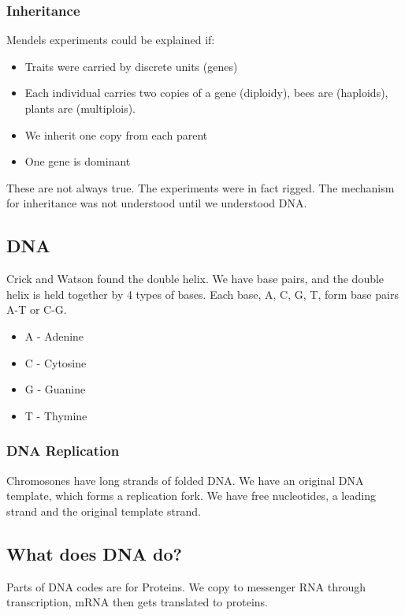 \subsubsection{Inheritance}
Mendels experiments could be explained if:
\begin{itemize}
    \itemsep0em
    \item Traits were carried by discrete units (genes)
    \item Each individual carries two copies of a gene (diploidy), bees are (haploids), plants are (multiplois).
    \item We inherit one copy from each parent
    \item One gene is dominant
\end{itemize}

\noident These are not always true. The experiments were in fact rigged. The mechanism for inheritance was not understood until we understood DNA.

\subsection{DNA}
Crick and Watson found the double helix. We have base pairs, and the double helix is held together by 4 types of bases. Each base, A, C, G, T, form base pairs A-T or C-G.

\begin{itemize}
    \itemsep0em
    \item A - Adenine
    \item C - Cytosine
    \item G - Guanine
    \item T - Thymine
\end{itemize}

\subsubsection{DNA Replication}
Chromosones have long strands of folded DNA. We have an original DNA template, which forms a replication fork. We have free nucleotides, a leading strand and the original template strand.

\subsection{What does DNA do?}
Parts of DNA codes are for Proteins. We copy to messenger RNA through transcription, mRNA then gets translated to proteins. \\

